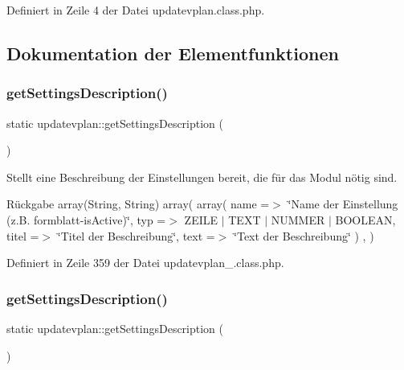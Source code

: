 Definiert in Zeile 4 der Datei updatevplan.\+class.\+php.



\subsection{Dokumentation der Elementfunktionen}
\mbox{\label{classupdatevplan_a43077a61ec1f3283f898e63baf0853cd}} 
\subsubsection{\texorpdfstring{get\+Settings\+Description()}{getSettingsDescription()}\hspace{0.1cm}{\footnotesize\ttfamily [1/2]}}
{\footnotesize\ttfamily static updatevplan\+::get\+Settings\+Description (\begin{DoxyParamCaption}{ }\end{DoxyParamCaption})\hspace{0.3cm}{\ttfamily [static]}}

Stellt eine Beschreibung der Einstellungen bereit, die für das Modul nötig sind. \begin{DoxyReturn}{Rückgabe}
array(\+String, String) array( array( \textquotesingle{}name\textquotesingle{} =$>$ \char`\"{}\+Name der Einstellung (z.\+B. formblatt-\/is\+Active)\char`\"{}, \textquotesingle{}typ\textquotesingle{} =$>$ Z\+E\+I\+LE $\vert$ T\+E\+XT $\vert$ N\+U\+M\+M\+ER $\vert$ B\+O\+O\+L\+E\+AN, \textquotesingle{}titel\textquotesingle{} =$>$ \char`\"{}\+Titel der Beschreibung\char`\"{}, \textquotesingle{}text\textquotesingle{} =$>$ \char`\"{}\+Text der Beschreibung\char`\"{} ) , ) 
\end{DoxyReturn}


Definiert in Zeile 359 der Datei updatevplan\+\_\+.\+class.\+php.

\mbox{\label{classupdatevplan_a43077a61ec1f3283f898e63baf0853cd}} 
\subsubsection{\texorpdfstring{get\+Settings\+Description()}{getSettingsDescription()}\hspace{0.1cm}{\footnotesize\ttfamily [2/2]}}
{\footnotesize\ttfamily static updatevplan\+::get\+Settings\+Description (\begin{DoxyParamCaption}{ }\end{DoxyParamCaption})\hspace{0.3cm}{\ttfamily [static]}}

